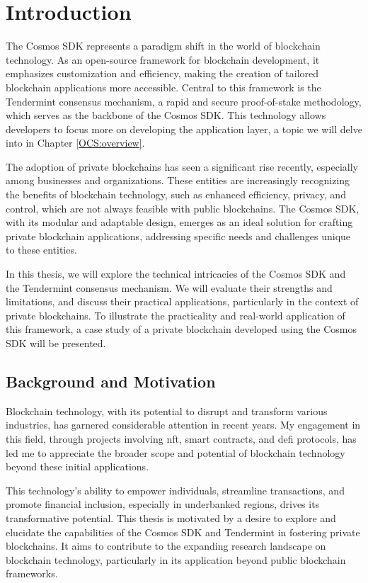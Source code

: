 \chapter{Introduction}
\label{ch:introduccion}

The Cosmos SDK represents a paradigm shift in the world of blockchain technology. As an open-source framework for blockchain development, it emphasizes customization and efficiency, making the creation of tailored blockchain applications more accessible. Central to this framework is the Tendermint consensus mechanism, a rapid and secure proof-of-stake methodology, which serves as the backbone of the Cosmos SDK. This technology allows developers to focus more on developing the application layer, a topic we will delve into in Chapter \ref{OCS:overview}.

The adoption of private blockchains has seen a significant rise recently, especially among businesses and organizations. These entities are increasingly recognizing the benefits of blockchain technology, such as enhanced efficiency, privacy, and control, which are not always feasible with public blockchains. The Cosmos SDK, with its modular and adaptable design, emerges as an ideal solution for crafting private blockchain applications, addressing specific needs and challenges unique to these entities.

In this thesis, we will explore the technical intricacies of the Cosmos SDK and the Tendermint consensus mechanism. We will evaluate their strengths and limitations, and discuss their practical applications, particularly in the context of private blockchains. To illustrate the practicality and real-world application of this framework, a case study of a private blockchain developed using the Cosmos SDK will be presented.

\section{Background and Motivation}

Blockchain technology, with its potential to disrupt and transform various industries, has garnered considerable attention in recent years. My engagement in this field, through projects involving \gls{nft}, smart contracts, and \gls{defi} protocols, has led me to appreciate the broader scope and potential of blockchain technology beyond these initial applications.

This technology's ability to empower individuals, streamline transactions, and promote financial inclusion, especially in underbanked regions, drives its transformative potential. This thesis is motivated by a desire to explore and elucidate the capabilities of the Cosmos SDK and Tendermint in fostering private blockchains. It aims to contribute to the expanding research landscape on blockchain technology, particularly in its application beyond public blockchain frameworks.

